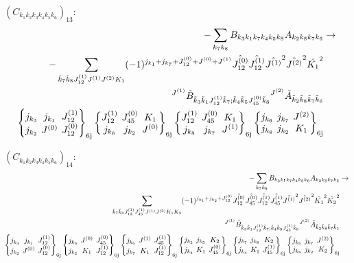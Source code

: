 \documentclass[11pt]{article}
\newcommand{\sixj}[6]{\begingroup\setlength{\arraycolsep}{0.2em}\begin{Bmatrix} #1 & #2 & #3 \\ #4 & #5 & #6 \end{Bmatrix}_{\text{6j}}\endgroup}
\begin{document}
$\left({C}_{{k}_{1}{k}_{2}{k}_{3}{k}_{4}{k}_{5}{k}_{6}}\right)_{13}$:
\begin{align}
-\sum_{{k}_{7}{k}_{8}}{B}_{{k}_{3}{k}_{1}{k}_{7}{k}_{4}{k}_{5}{k}_{8}}{A}_{{k}_{2}{k}_{8}{k}_{7}{k}_{6}}&\rightarrow \notag \\-\sum_{\tilde{k}_{7}\tilde{k}_{8}J^{(1)}_{12}J^{(1)}J^{(2)}K_{1}}(-1)^{j_{{k}_{1}} +j_{{k}_{7}} +J^{(0)}_{12} +J^{(0)} +J^{(1)} }\hat{J^{(0)}_{12}}\hat{J^{(1)}_{12}}\hat{J^{(1)}}^{2}\hat{J^{(2)}}^{2}\hat{K_{1}}^{2}& \notag \\{}^{J^{(1)}}\tilde{B}_{\tilde{k}_{3}\tilde{k}_{1}J^{(1)}_{12}\tilde{k}_{7};\tilde{k}_{4}\tilde{k}_{5}J^{(0)}_{45}\tilde{k}_{8}}{}^{J^{(2)}}\tilde{A}_{\tilde{k}_{2}\tilde{k}_{8}\tilde{k}_{7}\tilde{k}_{6}}& \notag \\\sixj{j_{{k}_{3}}}{j_{{k}_{1}}}{J^{(1)}_{12}}{j_{{k}_{2}}}{J^{(0)}}{J^{(0)}_{12}}\sixj{J^{(1)}_{12}}{J^{(0)}_{45}}{K_{1}}{j_{{k}_{6}}}{j_{{k}_{2}}}{J^{(0)}}\sixj{J^{(1)}_{12}}{J^{(0)}_{45}}{K_{1}}{j_{{k}_{8}}}{j_{{k}_{7}}}{J^{(1)}}\sixj{j_{{k}_{6}}}{j_{{k}_{7}}}{J^{(2)}}{j_{{k}_{8}}}{j_{{k}_{2}}}{K_{1}}
\end{align}

$\left({C}_{{k}_{1}{k}_{2}{k}_{3}{k}_{4}{k}_{5}{k}_{6}}\right)_{14}$:
\begin{align}
-\sum_{{k}_{7}{k}_{8}}{B}_{{k}_{3}{k}_{1}{k}_{7}{k}_{4}{k}_{8}{k}_{6}}{A}_{{k}_{2}{k}_{8}{k}_{7}{k}_{5}}&\rightarrow \notag \\\sum_{\tilde{k}_{7}\tilde{k}_{8}J^{(1)}_{12}J^{(1)}_{45}J^{(1)}J^{(2)}K_{1}K_{2}}(-1)^{j_{{k}_{1}} +j_{{k}_{2}} +J^{(0)}_{12} }\hat{J^{(0)}_{12}}\hat{J^{(0)}_{45}}\hat{J^{(1)}_{12}}\hat{J^{(1)}_{45}}\hat{J^{(1)}}^{2}\hat{J^{(2)}}^{2}\hat{K_{1}}^{2}\hat{K_{2}}^{2}& \notag \\{}^{J^{(1)}}\tilde{B}_{\tilde{k}_{3}\tilde{k}_{1}J^{(1)}_{12}\tilde{k}_{7};\tilde{k}_{4}\tilde{k}_{8}J^{(1)}_{45}\tilde{k}_{6}}{}^{J^{(2)}}\tilde{A}_{\tilde{k}_{2}\tilde{k}_{8}\tilde{k}_{7}\tilde{k}_{5}}& \notag \\\sixj{j_{{k}_{3}}}{j_{{k}_{1}}}{J^{(1)}_{12}}{j_{{k}_{2}}}{J^{(0)}}{J^{(0)}_{12}}\sixj{j_{{k}_{6}}}{J^{(0)}}{J^{(0)}_{45}}{j_{{k}_{2}}}{K_{1}}{J^{(1)}_{12}}\sixj{j_{{k}_{6}}}{J^{(1)}}{J^{(1)}_{45}}{j_{{k}_{7}}}{K_{1}}{J^{(1)}_{12}}\sixj{j_{{k}_{2}}}{j_{{k}_{5}}}{K_{2}}{j_{{k}_{4}}}{K_{1}}{J^{(0)}_{45}}\sixj{j_{{k}_{7}}}{j_{{k}_{8}}}{K_{2}}{j_{{k}_{4}}}{K_{1}}{J^{(1)}_{45}}\sixj{j_{{k}_{5}}}{j_{{k}_{7}}}{J^{(2)}}{j_{{k}_{8}}}{j_{{k}_{2}}}{K_{2}}
\end{align}
\end{document}
